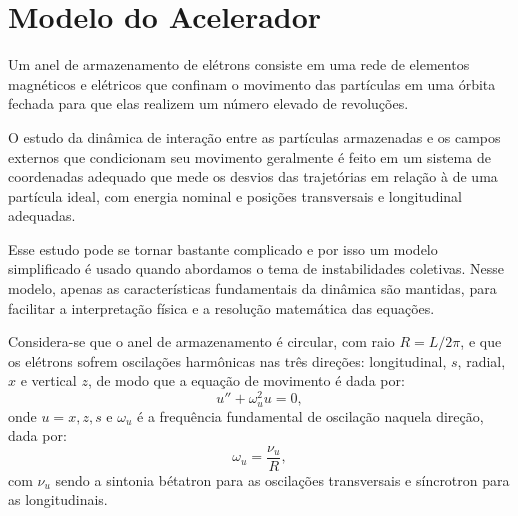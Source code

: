 \section{Modelo do Acelerador}
Um anel de armazenamento de elétrons consiste em uma rede de elementos magnéticos e elétricos que confinam o movimento das partículas em uma órbita fechada para que elas realizem um número elevado de revoluções.

O estudo da dinâmica de interação entre as partículas armazenadas e os campos externos que condicionam seu movimento geralmente é feito em um sistema de coordenadas adequado que mede os desvios das trajetórias em relação à de uma partícula ideal, com energia nominal e posições transversais e longitudinal adequadas.

Esse estudo pode se tornar bastante complicado e por isso um modelo simplificado é usado quando abordamos o tema de instabilidades coletivas. Nesse modelo, apenas as características fundamentais da dinâmica são mantidas, para facilitar a interpretação física e a resolução matemática das equações.

Considera-se que o anel de armazenamento é circular, com raio $R = L/2\pi$, e que os elétrons sofrem oscilações harmônicas nas três direções: longitudinal, $s$, radial, $x$ e vertical $z$, de modo que a equação de movimento é dada por:
\begin{equation}\label{modelo}
 u'' + \omega_u^2 u = 0,
\end{equation}
onde $u = x, z, s$ e $\omega_u$ é a frequência fundamental de oscilação naquela direção, dada por:
\begin{equation}\nonumber
  \omega_u = \frac{\nu_u}{R},
\end{equation}
com $\nu_u$ sendo a sintonia bétatron para as oscilações transversais e síncrotron para as longitudinais.

